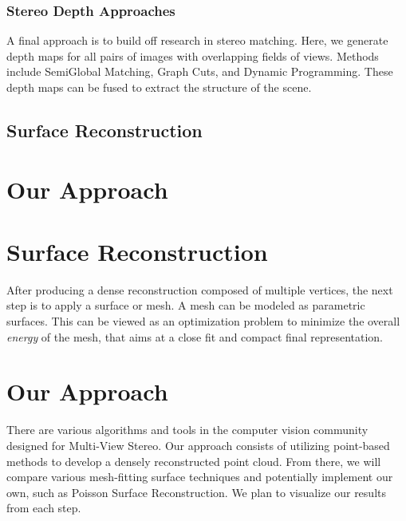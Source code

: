 \documentclass[10pt,twocolumn,letterpaper]{article}
\begin{document}
\subsubsection{Stereo Depth Approaches}

A final approach is to build off research in stereo matching. Here, we generate depth maps for all pairs of images with overlapping fields of views. Methods include SemiGlobal Matching, Graph Cuts, and Dynamic Programming.\cite{sgm,taxonomy} These depth maps can be fused to extract the structure of the scene.\cite{fuse}


\subsection{Surface Reconstruction}

\section{Our Approach}


\section{Surface Reconstruction}
After producing a dense reconstruction composed of multiple vertices, the next step is to apply a surface or mesh.  A mesh can be modeled as parametric surfaces.  This can be viewed as an optimization problem to minimize the overall \textit{energy} of the mesh, that aims at a close fit and compact final representation.



\section{Our Approach}
There are various algorithms and tools in the computer vision community designed for Multi-View Stereo.  Our approach consists of utilizing point-based methods to develop a densely reconstructed point cloud.  From there, we will compare various mesh-fitting surface techniques and potentially implement our own, such as Poisson Surface Reconstruction.  We plan to visualize our results from each step.
\end{document}
